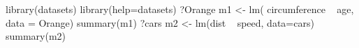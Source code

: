\begin{Schunk}
\begin{Sinput}
 library(datasets)
 library(help=datasets)
 ?Orange
 m1 <- lm( circumference ~ age, data = Orange)
 summary(m1)
 ?cars
 m2 <- lm(dist ~ speed, data=cars) 
 summary(m2)
\end{Sinput}
\end{Schunk}

